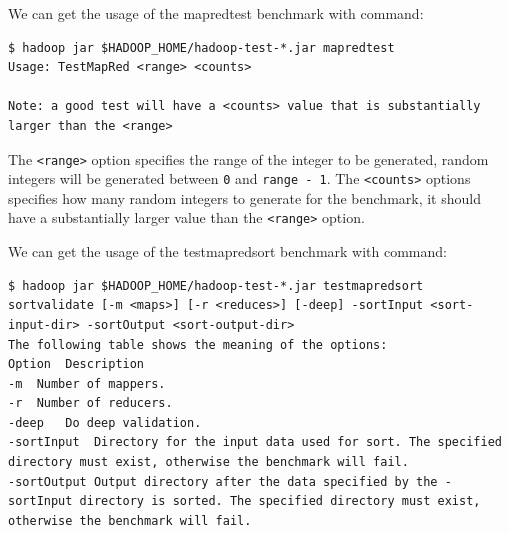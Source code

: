 We can get the usage of the mapredtest benchmark with command:
\lstset{style=bashstyle}
\begin{lstlisting}
$ hadoop jar $HADOOP_HOME/hadoop-test-*.jar mapredtest
Usage: TestMapRed <range> <counts>

Note: a good test will have a <counts> value that is substantially larger than the <range>
\end{lstlisting}
The \verb|<range>| option specifies the range of the integer to be generated, random integers will be generated between \verb|0| and \verb|range - 1|. The \verb|<counts>| options specifies how many random integers to generate for the benchmark, it should have a substantially larger value than the \verb|<range>| option.

We can get the usage of the testmapredsort benchmark with command:
\lstset{style=bashstyle}
\begin{lstlisting}
$ hadoop jar $HADOOP_HOME/hadoop-test-*.jar testmapredsort
sortvalidate [-m <maps>] [-r <reduces>] [-deep] -sortInput <sort-input-dir> -sortOutput <sort-output-dir>
The following table shows the meaning of the options:
Option	Description
-m	Number of mappers.
-r 	Number of reducers.
-deep	Do deep validation.
-sortInput	Directory for the input data used for sort. The specified directory must exist, otherwise the benchmark will fail.
-sortOutput	Output directory after the data specified by the -sortInput directory is sorted. The specified directory must exist, otherwise the benchmark will fail.
\end{lstlisting}
